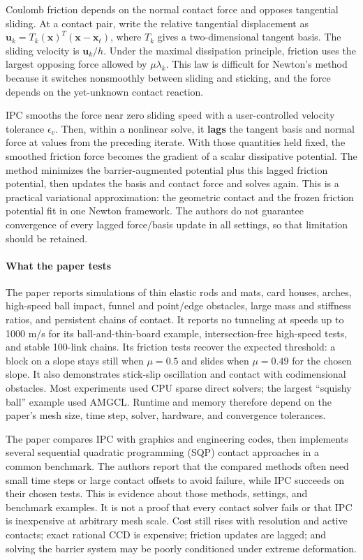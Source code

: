 Coulomb friction depends on the normal contact force and opposes tangential sliding. At a contact pair, write the relative tangential displacement as \(\mathbf{u}_k=T_k(\mathbf{x})^T(\mathbf{x}-\mathbf{x}_t)\), where \(T_k\) gives a two-dimensional tangent basis. The sliding velocity is \(\mathbf{u}_k/h\). Under the maximal dissipation principle, friction uses the largest opposing force allowed by \(\mu\lambda_k\). This law is difficult for Newton's method because it switches nonsmoothly between sliding and sticking, and the force depends on the yet-unknown contact reaction.

IPC smooths the force near zero sliding speed with a user-controlled velocity tolerance \(\epsilon_v\). Then, within a nonlinear solve, it \textbf{lags} the tangent basis and normal force at values from the preceding iterate. With those quantities held fixed, the smoothed friction force becomes the gradient of a scalar dissipative potential. The method minimizes the barrier-augmented potential plus this lagged friction potential, then updates the basis and contact force and solves again. This is a practical variational approximation: the geometric contact and the frozen friction potential fit in one Newton framework. The authors do not guarantee convergence of every lagged force/basis update in all settings, so that limitation should be retained.

\paragraph{What the paper tests}\label{what-the-paper-tests}

The paper reports simulations of thin elastic rods and mats, card houses, arches, high-speed ball impact, funnel and point/edge obstacles, large mass and stiffness ratios, and persistent chains of contact. It reports no tunneling at speeds up to 1000 m/s for its ball-and-thin-board example, intersection-free high-speed tests, and stable 100-link chains. Its friction tests recover the expected threshold: a block on a slope stays still when \(\mu=0.5\) and slides when \(\mu=0.49\) for the chosen slope. It also demonstrates stick-slip oscillation and contact with codimensional obstacles. Most experiments used CPU sparse direct solvers; the largest ``squishy ball'' example used AMGCL. Runtime and memory therefore depend on the paper's mesh size, time step, solver, hardware, and convergence tolerances.

The paper compares IPC with graphics and engineering codes, then implements several sequential quadratic programming (SQP) contact approaches in a common benchmark. The authors report that the compared methods often need small time steps or large contact offsets to avoid failure, while IPC succeeds on their chosen tests. This is evidence about those methods, settings, and benchmark examples. It is not a proof that every contact solver fails or that IPC is inexpensive at arbitrary mesh scale. Cost still rises with resolution and active contacts; exact rational CCD is expensive; friction updates are lagged; and solving the barrier system may be poorly conditioned under extreme deformation.

